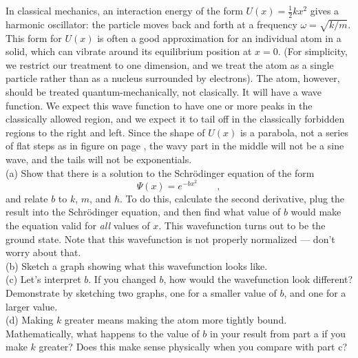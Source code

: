 In classical mechanics, an interaction energy of the form
$U(x)=\frac{1}{2}kx^2$ gives a harmonic oscillator: the particle moves
back and forth at a frequency $\omega=\sqrt{k/m}$. This form
for $U(x)$ is often a good approximation for an individual atom
in a solid, which can vibrate around its equilibrium position
at $x=0$. (For simplicity, we restrict our treatment to one
dimension, and we treat the atom as a single particle rather
than as a nucleus surrounded by electrons).
The atom, however, should be treated quantum-mechanically,
not clasically. It will have a wave function. We expect this wave
function to have one or more peaks in the classically allowed
region, and we expect it to tail off in the classically
forbidden regions to the right and left. Since the shape
of $U(x)$ is a parabola, not a series of flat steps as
in figure  on page \pageref{fig:barrier-with-u-notation}, the
wavy part in the middle will not be a sine wave, and the
tails will not be exponentials.\\
(a) Show that there is a solution
to the Schr\"{o}dinger equation of the form
\begin{equation*}
\Psi(x)=e^{-bx^2} \qquad ,
\end{equation*}
and relate $b$ to $k$, $m$, and $\hbar$. To do this, calculate the
second derivative, plug the result into the Schr\"{o}dinger
equation, and then find what value of $b$ would make the equation
valid for \emph{all} values of $x$. 
This wavefunction turns out to be the ground state.
Note that this wavefunction
is not properly normalized --- don't worry about that.\answercheck\\
(b) Sketch a graph showing what this wavefunction looks like.\\
(c) Let's interpret $b$. If you changed $b$, how would the wavefunction
look different? Demonstrate by sketching two graphs, one for a smaller
value of $b$, and one for a larger value.\\
(d) Making $k$ greater means making the atom more tightly bound.
Mathematically, what happens to the value of $b$ in
your result from part a if you make $k$ greater? Does this make
sense physically when you compare with part c?

